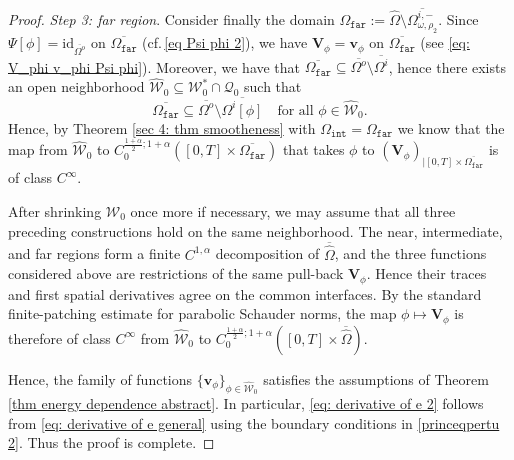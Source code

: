 \documentclass[11pt,reqno,a4paper]{amsart}
\theoremstyle{plain}
\theoremstyle{definition}
\begin{document}
\begin{proof}
    \smallskip
    \textit{Step 3: far region}. Consider finally the domain $\Omega_{\mathtt{far}} := \widehat\Omega \setminus\overline{\Omega^{i,-}_{\omega,\rho_2}}$. Since $\Psi[\phi] = \mathrm{id}_{\overline{\Omega^o}}$ on $\overline{\Omega_{\mathtt{far}}}$ (cf.\,\eqref{eq Psi phi 2}), we have $\mathbf{V}_\phi = \mathbf{v}_\phi$ on $\overline{\Omega_{\mathtt{far}}}$ (see \eqref{eq: V_phi v_phi Psi phi}). Moreover, we have that $\overline{\Omega_{\mathtt{far}}} \subseteq \overline{\Omega^o}\setminus\overline{\Omega^i}$, hence there exists an open neighborhood $\widehat{\mathcal{W}}_0 \subseteq \mathcal{W}^\ast_0 \cap \mathcal{Q}_0$ such that 
    \[
    \overline{\Omega_{\mathtt{far}}} \subseteq \overline{\Omega^o} \setminus \overline{\Omega^i[\phi]}  \quad \text{for all } \phi \in \widehat{\mathcal{W}}_0.
    \]
    Hence, by Theorem \ref{sec 4: thm smootheness} with $\Omega_{\mathtt{int}} = \Omega_{\mathtt{far}}$ we know that the map from $\widehat{\mathcal{W}}_0$ to $C_{0}^{\frac{1+\alpha}{2}; 1+\alpha}([0,T] \times \overline{\Omega_\mathtt{far}})$ that takes $\phi$ to $(\mathbf{V}_\phi)_{|[0,T] \times \overline{\Omega_\mathtt{far}}}$ is of class $C^\infty$.

    \smallskip
    After shrinking $\widehat{\mathcal{W}}_0$ once more if necessary, we may assume that all three preceding constructions hold on the same neighborhood. The near, intermediate, and far regions form a finite $C^{1,\alpha}$ decomposition of $\overline{\widehat\Omega}$, and the three functions considered above are restrictions of the same pull-back $\mathbf{V}_\phi$. Hence their traces and first spatial derivatives agree on the common interfaces. By the standard finite-patching estimate for parabolic Schauder norms, the map $\phi \mapsto \mathbf{V}_\phi$ is therefore of class $C^\infty$ from $\widehat{\mathcal{W}}_0$ to $C_0^{\frac{1+\alpha}{2};1+\alpha}([0,T]\times\overline{\widehat\Omega})$.

    Hence, the family of functions $\{\mathbf{v}_\phi\}_{\phi \in \widehat{\mathcal{W}}_0}$ satisfies the assumptions of Theorem \ref{thm energy dependence abstract}. In particular, \eqref{eq: derivative of e 2} follows from \eqref{eq: derivative of e general} using the boundary conditions in \eqref{princeqpertu 2}. Thus the proof is complete. 
    
\end{proof}
\end{document}
